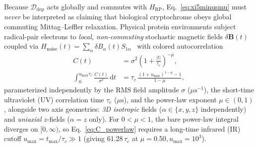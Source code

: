 \documentclass[twocolumn,10pt,amsmath,amssymb,floatfix]{revtex4-2}
\theoremstyle{plain}
\theoremstyle{definition}
\newcommand{\dd}{\mathrm{d}}
\newcommand{\HRP}{H_{\mathrm{RP}}}
\begin{document}
Because $\mathcal{D}_{\mathrm{dep}}$ acts globally and commutes with $\HRP$, Eq.~\eqref{eq:xi5minusmu} must \emph{never} be interpreted as claiming that biological cryptochrome obeys global commuting Mittag--Leffler relaxation. Physical protein environments subject radical-pair electrons to \emph{local, non-commuting} stochastic magnetic fields $\delta\mathbf{B}(t)$ coupled via $H_{\mathrm{noise}}(t) = \sum_{\alpha} \delta B_\alpha(t) S_{1\alpha}$~\cite{Kattnig2016PCCP,Worster2016JCP,Fay2019JCP} with colored autocorrelation
\begin{align}
\label{eq:C_powerlaw}
C(t) &= \sigma^2 \left(1 + \frac{|t|}{\tau_c}\right)^{-\mu}, \nonumber\\
\int_0^{u_{\max}\tau_c} \frac{C(t)}{\sigma^2}\,\dd t &= \tau_c\,\frac{(1+u_{\max})^{1-\mu}-1}{1-\mu},
\end{align}
parameterized independently by the RMS field amplitude $\sigma$ ($\mu\text{s}^{-1}$), the short-time ultraviolet (UV) correlation time $\tau_c$ ($\mu\text{s}$), and the power-law exponent $\mu \in (0,1)$, alongside two axis geometries: \emph{3D isotropic} fields ($\alpha \in \{x,y,z\}$ independently) and \emph{uniaxial} $z$-fields ($\alpha = z$ only). For $0 < \mu < 1$, the bare power-law integral diverges on $[0,\infty)$, so Eq.~\eqref{eq:C_powerlaw} requires a long-time infrared (IR) cutoff $u_{\max} = t_{\max}/\tau_c \gg 1$ (giving $61.28\,\tau_c$ at $\mu=0.50, u_{\max}=10^3$).
\end{document}
